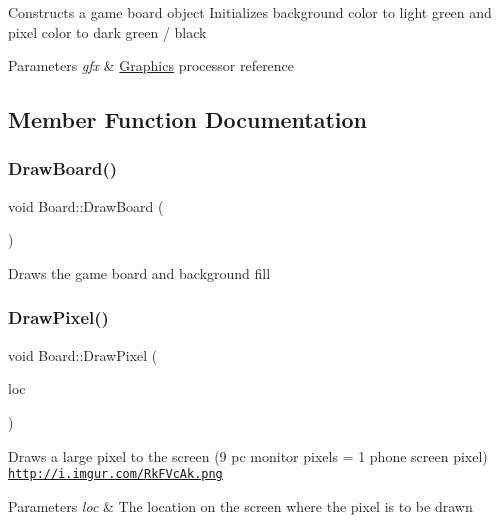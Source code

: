 Constructs a game board object Initializes background color to light green and pixel color to dark green / black


\begin{DoxyParams}{Parameters}
{\em gfx} & \hyperlink{class_graphics}{Graphics} processor reference \\
\hline
\end{DoxyParams}


\subsection{Member Function Documentation}
\mbox{\label{class_board_a13216aad741156a095cf4509026a6649}} 
\subsubsection{\texorpdfstring{Draw\+Board()}{DrawBoard()}}
{\footnotesize\ttfamily void Board\+::\+Draw\+Board (\begin{DoxyParamCaption}{ }\end{DoxyParamCaption})}

Draws the game board and background fill \mbox{\label{class_board_a3bfb1c528ae857f74b9ff3b3ba8d1911}} 
\subsubsection{\texorpdfstring{Draw\+Pixel()}{DrawPixel()}}
{\footnotesize\ttfamily void Board\+::\+Draw\+Pixel (\begin{DoxyParamCaption}\item[{const \hyperlink{class_pixel_location}{Pixel\+Location} \&}]{loc }\end{DoxyParamCaption})}

Draws a large pixel to the screen (9 pc monitor pixels = 1 phone screen pixel) \href{http://i.imgur.com/RkFVcAk.png}{\tt http\+://i.\+imgur.\+com/\+Rk\+F\+Vc\+Ak.\+png}


\begin{DoxyParams}{Parameters}
{\em loc} & The location on the screen where the pixel is to be drawn \\
\hline
\end{DoxyParams}
\mbox{\label{class_board_af00a708a0b6f2744b4494bd0d5fe0221}} 
